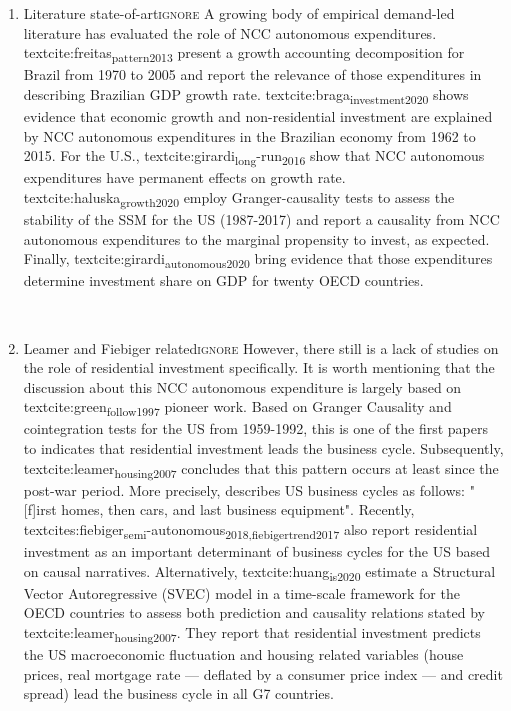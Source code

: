 \documentclass[12pt]{article}
\begin{document}
\begin{enumerate}
\item Literature state-of-art\hfill{}\textsc{ignore}
\label{sec:orgd7b09e0}
A growing body of empirical demand-led literature has evaluated the role of NCC autonomous expenditures.
textcite:freitas\textsubscript{pattern}\textsubscript{2013} present a growth accounting decomposition for Brazil from 1970 to 2005 and report the relevance of those expenditures in describing Brazilian GDP growth rate.
textcite:braga\textsubscript{investment}\textsubscript{2020} shows evidence that economic growth and non-residential investment are explained by NCC autonomous expenditures in the Brazilian economy from 1962 to 2015.
For the U.S., textcite:girardi\textsubscript{long}-run\textsubscript{2016} show that NCC autonomous expenditures have permanent effects on growth rate.
textcite:haluska\textsubscript{growth}\textsubscript{2020} employ Granger-causality tests to assess the stability of the SSM for the US (1987-2017) and report a causality from NCC autonomous expenditures to the marginal propensity to invest, as expected.
Finally, textcite:girardi\textsubscript{autonomous}\textsubscript{2020} bring evidence that those expenditures determine investment share on GDP for twenty OECD countries.

\\

\item Leamer and Fiebiger related\hfill{}\textsc{ignore}
\label{sec:org7b46a25}
However, there still is a lack of studies on the role of residential investment specifically.
It is worth mentioning that the discussion about this NCC autonomous expenditure is largely based on textcite:green\textsubscript{follow}\textsubscript{1997} pioneer work.
Based on Granger Causality and cointegration tests for the US from 1959-1992, this is one of the first papers to indicates that residential investment leads the business cycle.
Subsequently, textcite:leamer\textsubscript{housing}\textsubscript{2007} concludes that this pattern occurs at least since the post-war period.
More precisely,  \textcite[p.~8]{leamer_housing_2007} describes US business cycles as follows: "[f]irst homes, then cars,
and last business equipment".
Recently, textcites:fiebiger\textsubscript{semi}-autonomous\textsubscript{2018,fiebiger}\textsubscript{trend}\textsubscript{2017} also report residential investment as an important determinant of business cycles for the US based on causal narratives.
Alternatively, textcite:huang\textsubscript{is}\textsubscript{2020} estimate a Structural Vector Autoregressive (SVEC) model in a time-scale framework for the OECD countries to assess both prediction and causality relations stated by textcite:leamer\textsubscript{housing}\textsubscript{2007}.
They report that residential investment predicts the US  macroeconomic fluctuation and housing related variables (house prices, real mortgage rate --- deflated by a consumer price index --- and credit spread) lead the business cycle in all G7 countries.


\end{enumerate}
\end{document}
